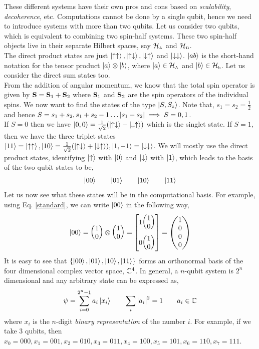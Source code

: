     \noindent
    These different systems have their own pros and cons based on \textit{scalability}, \textit{decoherence}, etc. Computations cannot be done by a single qubit, hence we need to introduce systems with more than two qubits. Let us consider two qubits, which is equivalent to combining two spin-half systems. These two spin-half objects live in their separate Hilbert spaces, say $\mathcal H_{\text{\tiny A}}$ and $\mathcal H_{\text{\tiny B}}$.\\[0.2cm]
    The direct product states are just $\ket{\uparrow \uparrow}, \ket{\uparrow \downarrow},\ket{\downarrow \uparrow}$ and $\ket{\downarrow \downarrow}$. $\ket{ab}$ is the short-hand notation for the tensor product $\ket{a}\otimes \ket{b}$, where $\ket{a}\in \mathcal H_{\text{\tiny A}}$ and $\ket{b}\in \mathcal H_{\text{\tiny b}}$. Let us consider the direct sum states too.\\[0.2cm]
    From the addition of angular momentum, we know that the total spin operator is given by $\vb{S}= \vb{S}_1+\vb{S}_2$ where $\vb{S}_1$ and $\vb{S}_2$ are the spin operators of the individual spins. We now want to find the states of the type $\ket{S,S_z}$. Note that, $s_1=s_2=\frac{1}{2}$ and hence $S=s_1+s_2, s_1+s_2-1\ldots \abs{s_1-s_2} \implies S= 0,1$.\\[0.2cm]
    If $S=0$ then we have $\ket{0,0} = \frac{1}{\sqrt{2}}\qty(\ket{\uparrow\downarrow} - \ket{\downarrow\uparrow})$ which is the singlet state. If $S=1$, then we have the three triplet states $\ket{11} = \ket{\uparrow\uparrow}, \ket{10} = \frac{1}{\sqrt{2}}\qty(\ket{\uparrow\downarrow} + \ket{\downarrow\uparrow}), \ket{1,-1} = \ket{\downarrow\downarrow}$. We will mostly use the direct product states, identifying $\ket{\uparrow}$ with $\ket{0}$ and $\ket{\downarrow}$ with $\ket{1}$, which leads to the basis of the two qubit states to be,
    $$\ket{00}\qquad \ket{01}\qquad \ket{10}\qquad \ket{11}$$
    Let us now see what these states will be in the computational basis. For example, using Eq. \eqref{standard}, we can write $\ket{00}$ in the following way,
    \begin{align*}
        \ket{00} = \mqty(1\\ 0)\otimes \mqty(1\\ 0) = \mqty[1\mqty(1\\ 0) \\[0.4cm] 0 \mqty(1\\ 0)] = \mqty(1\\ 0\\ 0 \\ 0)
    \end{align*}
    It is easy to see that $\{\ket{00}, \ket{01},\ket{10},\ket{11}\}$ forms an orthonormal basis of the four dimensional complex vector space, $\mathbb{C}^4$. In general, a $n$-qubit system is $2^n$ dimensional and any arbitrary state can be expressed as,
    $$\psi = \sum\limits_{i=0}^{2^n -1} a_i \ket{x_i}\qquad \sum\limits_i \abs{a_i}^2 =1\qquad a_i\in \mathbb{C}$$
    where $x_i$ is the $n$-digit \textit{binary representation} of the number $i$. For example, if we take $3$ qubits, then $x_0 = 000, x_1=001, x_2=010, x_3=011, x_4=100,x_5=101,x_6=110,x_7=111$.
